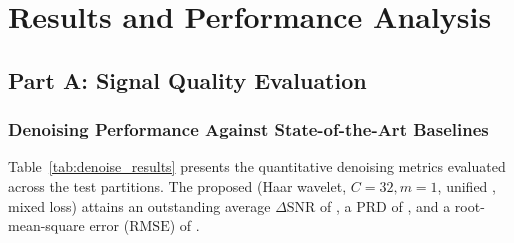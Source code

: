 \section{Results and Performance Analysis}
\label{sec:results}

\subsection{Part A: Signal Quality Evaluation}

\subsubsection{Denoising Performance Against State-of-the-Art Baselines}
Table~\ref{tab:denoise_results} presents the quantitative denoising metrics evaluated across the test partitions. The proposed \HSL{} (Haar wavelet, $C=32, m=1$, unified \RSE{}, mixed loss) attains an outstanding average $\Delta\mathrm{SNR}$ of , a $\mathrm{PRD}$ of , and a root-mean-square error ($\mathrm{RMSE}$) of . 

